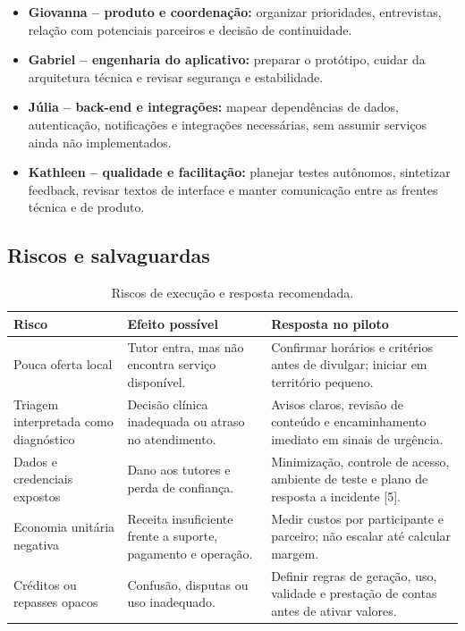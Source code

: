 \documentclass[12pt,a4paper]{article}
\begin{document}
\begin{itemize}
\item \textbf{Giovanna -- produto e coordenação:} organizar prioridades, entrevistas, relação com potenciais parceiros e decisão de continuidade.
\item \textbf{Gabriel -- engenharia do aplicativo:} preparar o protótipo, cuidar da arquitetura técnica e revisar segurança e estabilidade.
\item \textbf{Júlia -- back-end e integrações:} mapear dependências de dados, autenticação, notificações e integrações necessárias, sem assumir serviços ainda não implementados.
\item \textbf{Kathleen -- qualidade e facilitação:} planejar testes autônomos, sintetizar feedback, revisar textos de interface e manter comunicação entre as frentes técnica e de produto.
\end{itemize}

\subsection{Riscos e salvaguardas}

\begin{table}[H]
\centering
\small
\caption{Riscos de execução e resposta recomendada.}
\begin{tabularx}{\textwidth}{P{3.2cm}YY}
\toprule
\textbf{Risco} & \textbf{Efeito possível} & \textbf{Resposta no piloto} \\
\midrule
Pouca oferta local & Tutor entra, mas não encontra serviço disponível. & Confirmar horários e critérios antes de divulgar; iniciar em território pequeno. \\
Triagem interpretada como diagnóstico & Decisão clínica inadequada ou atraso no atendimento. & Avisos claros, revisão de conteúdo e encaminhamento imediato em sinais de urgência. \\
Dados e credenciais expostos & Dano aos tutores e perda de confiança. & Minimização, controle de acesso, ambiente de teste e plano de resposta a incidente [5]. \\
Economia unitária negativa & Receita insuficiente frente a suporte, pagamento e operação. & Medir custos por participante e parceiro; não escalar até calcular margem. \\
Créditos ou repasses opacos & Confusão, disputas ou uso inadequado. & Definir regras de geração, uso, validade e prestação de contas antes de ativar valores. \\
\bottomrule
\end{tabularx}
\end{table}
\end{document}
